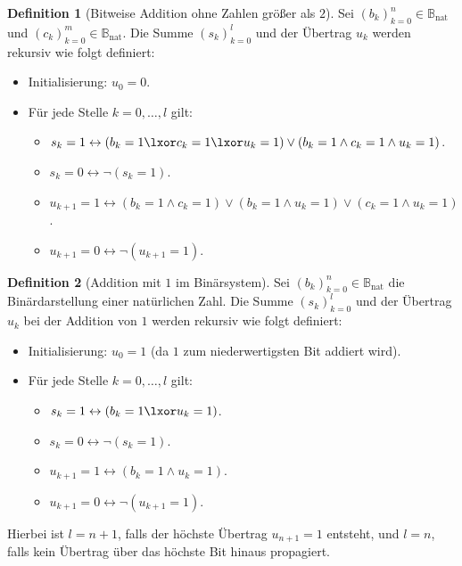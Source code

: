 \documentclass{book}
\theoremstyle{plain}
\theoremstyle{remark}
\theoremstyle{definition}
\newtheorem{definition}{Definition}[section]
\begin{document}
\begin{definition}[Bitweise Addition ohne Zahlen größer als \(2\)]
    Sei \( (b_k)_{k=0}^n \in \mathbb{B}_{\text{nat}} \) und \( (c_k)_{k=0}^m \in \mathbb{B}_{\text{nat}} \). Die Summe \( (s_k)_{k=0}^l \) und der Übertrag \( u_k \) werden rekursiv wie folgt definiert:
    \begin{itemize}
        \item Initialisierung: \( u_0 = 0 \).
        \item Für jede Stelle \( k = 0, \ldots, l \) gilt:
        \begin{itemize}
            \item \( s_k = 1 \leftrightarrow(b_k = 1 \lxor c_k = 1 \lxor u_k = 1) \lor (b_k = 1 \wedge c_k = 1 \wedge u_k = 1)\).
            \item \( s_k = 0 \leftrightarrow \neg(s_k=1)\).
            \item \( u_{k+1} = 1 \leftrightarrow (b_k = 1 \wedge c_k = 1) \lor (b_k = 1 \wedge u_k = 1) \lor (c_k = 1 \wedge u_k = 1)\).
            \item \( u_{k+1} = 0 \leftrightarrow \neg(u_{k+1} = 1)\).
        \end{itemize}
    \end{itemize}
\end{definition}

\begin{definition}[Addition mit \(1\) im Binärsystem]
    Sei \( (b_k)_{k=0}^n \in \mathbb{B}_{\text{nat}} \) die Binärdarstellung einer natürlichen Zahl. Die Summe \( (s_k)_{k=0}^l \) und der Übertrag \( u_k \) bei der Addition von \(1\) werden rekursiv wie folgt definiert:
    \begin{itemize}
        \item Initialisierung: \( u_0 = 1 \) (da \(1\) zum niederwertigsten Bit addiert wird).
        \item Für jede Stelle \( k = 0, \ldots, l \) gilt:
        \begin{itemize}
            \item \( s_k = 1 \leftrightarrow (b_k = 1 \lxor u_k = 1) \).
            \item \( s_k = 0 \leftrightarrow \neg(s_k = 1)\).
            \item \( u_{k+1} = 1 \leftrightarrow (b_k = 1 \wedge u_k = 1)\).
            \item \( u_{k+1} = 0 \leftrightarrow \neg(u_{k+1} = 1)\).
        \end{itemize}
    \end{itemize}
    Hierbei ist \( l = n + 1 \), falls der höchste Übertrag \( u_{n+1} = 1 \) entsteht, und \( l = n \), falls kein Übertrag über das höchste Bit hinaus propagiert.
\end{definition}
\end{document}

